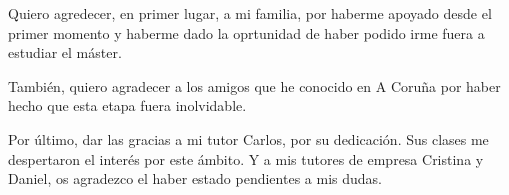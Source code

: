 Quiero agredecer, en primer lugar, a mi familia, por haberme apoyado desde el primer momento y haberme dado la oprtunidad de haber podido irme fuera a estudiar el máster. 

También, quiero agradecer a los amigos que he conocido en A Coruña por haber hecho que esta etapa fuera inolvidable.

 Por último, dar las gracias a mi tutor Carlos, por su dedicación. Sus clases me despertaron el interés por este ámbito. Y a mis tutores de empresa Cristina y Daniel, os agradezco el haber estado pendientes a mis dudas. 

